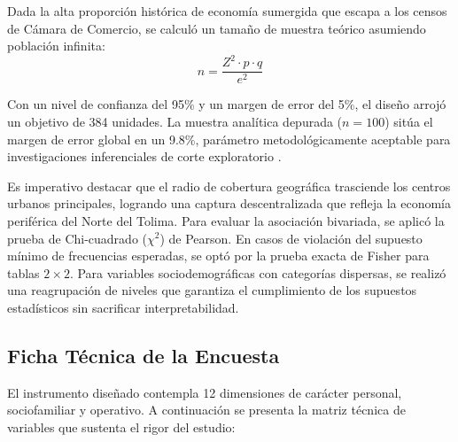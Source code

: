 \documentclass[11pt,a4paper]{article}
\begin{document}
\par
Dada la alta proporción histórica de economía sumergida que escapa a los censos de Cámara de Comercio, se calculó un tamaño de muestra teórico asumiendo población infinita:
\begin{equation}
    n = \frac{Z^{2} \cdot p \cdot q}{e^{2}}
\end{equation}

Con un nivel de confianza del 95\% y un margen de error del 5\%, el diseño arrojó un objetivo de 384 unidades. La muestra analítica depurada ($n = 100$) sitúa el margen de error global en un 9.8\%, parámetro metodológicamente aceptable para investigaciones inferenciales de corte exploratorio \citep{hernandez2014}.

\par
Es imperativo destacar que el radio de cobertura geográfica trasciende los centros urbanos principales, logrando una captura descentralizada que refleja la economía periférica del Norte del Tolima. Para evaluar la asociación bivariada, se aplicó la prueba de Chi-cuadrado ($\chi^{2}$) de Pearson. En casos de violación del supuesto mínimo de frecuencias esperadas, se optó por la prueba exacta de Fisher para tablas $2 \times 2$. Para variables sociodemográficas con categorías dispersas, se realizó una reagrupación de niveles que garantiza el cumplimiento de los supuestos estadísticos sin sacrificar interpretabilidad.

\subsection{Ficha T\'ecnica de la Encuesta}
El instrumento diseñado contempla 12 dimensiones de carácter personal, sociofamiliar y operativo. A continuación se presenta la matriz técnica de variables que sustenta el rigor del estudio:
\end{document}
